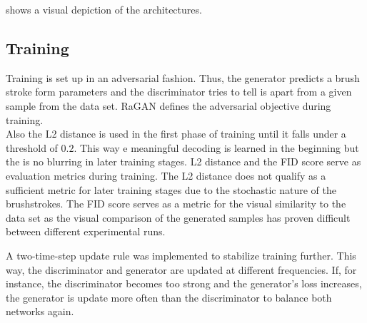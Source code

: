  shows a visual depiction of the architectures.

%        
%        

\subsection{Training}
Training is set up in an adversarial fashion.
Thus, the generator predicts a brush stroke form parameters and the discriminator tries to tell is apart from a given sample from the data set.
RaGAN defines the adversarial objective during training.\\
Also the L2 distance is used in the first phase of training until it falls under a threshold of $0.2$.
This way e meaningful decoding is learned in the beginning but the is no blurring in later training stages.
L2 distance and the FID score serve as evaluation metrics during training.
The L2 distance does not qualify as a sufficient metric for later training stages due to the stochastic nature of the brushstrokes.
The FID score serves as a metric for the visual similarity to the data set as the visual comparison of the generated samples has proven difficult between different experimental runs.

A two-time-step update rule was implemented to stabilize training further.
This way, the discriminator and generator are updated at different frequencies.
If, for instance, the discriminator becomes too strong and the generator's loss increases, the generator is update more often than the discriminator to balance both networks again.

